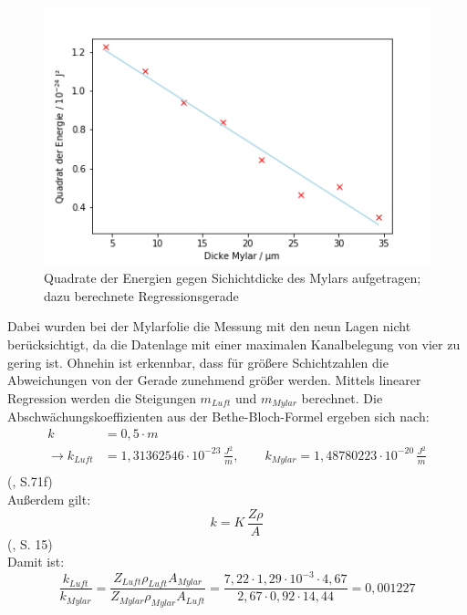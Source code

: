 \begin{figure}[h]
    \centering
    \includegraphics[scale=0.75]{Bilder/mylarger.png}
    \caption{Quadrate der Energien gegen Sichichtdicke des Mylars aufgetragen; dazu berechnete Regressionsgerade}
    \label{bild:mylarger}
\end{figure}

\clearpage

Dabei wurden bei der Mylarfolie die Messung mit den neun Lagen nicht berücksichtigt, da die Datenlage mit einer maximalen Kanalbelegung 
von vier zu gering ist. Ohnehin ist erkennbar, dass für größere Schichtzahlen die Abweichungen von der Gerade zunehmend größer werden. 
Mittels linearer Regression werden die Steigungen $m_{Luft}$ und $m_{Mylar}$ berechnet. Die Abschwächungskoeffizienten aus der 
Bethe-Bloch-Formel ergeben sich nach: \\

\begin{align}
    k &= 0,5 \cdot m \nonumber \\
    \to k_{Luft} &= 1,31362546 \cdot 10^{-23} \, \frac{J^2}{m}, \qquad k_{Mylar} = 1,48780223 \cdot 10^{-20} \, \frac{J^2}{m} \\
\end{align}
(\cite{Jaekel1997}, S.71f) \\

Außerdem gilt: \\

\begin{equation}
    k = K \, \frac{Z \rho}{A}
\end{equation}
(\cite{Kador2021}, S. 15) \\

Damit ist: \\

\begin{equation}
    \frac{k_{Luft}}{k_{Mylar}} = \frac{Z_{Luft} \rho_{Luft} A_{Mylar}}{Z_{Mylar} \rho_{Mylar} A_{Luft}} = 
    \frac{7,22 \cdot 1,29 \cdot 10^{-3} \cdot 4,67}{2,67 \cdot 0,92 \cdot 14,44} = 0,001227
\end{equation}
 
